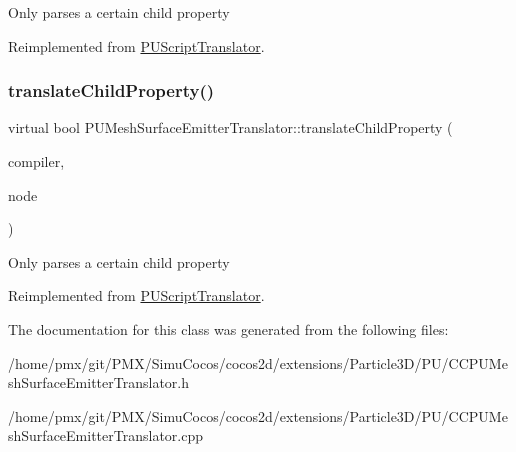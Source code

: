 Only parses a certain child property 

Reimplemented from \hyperlink{classPUScriptTranslator_a0374d83a8a04e57918975d525e0f8fe8}{P\+U\+Script\+Translator}.

\mbox{\label{classPUMeshSurfaceEmitterTranslator_a0f3b7e1bdf56f0eb1920cacffe8f59d9}} 
\subsubsection{\texorpdfstring{translate\+Child\+Property()}{translateChildProperty()}\hspace{0.1cm}{\footnotesize\ttfamily [2/2]}}
{\footnotesize\ttfamily virtual bool P\+U\+Mesh\+Surface\+Emitter\+Translator\+::translate\+Child\+Property (\begin{DoxyParamCaption}\item[{\hyperlink{classPUScriptCompiler}{P\+U\+Script\+Compiler} $\ast$}]{compiler,  }\item[{\hyperlink{classPUAbstractNode}{P\+U\+Abstract\+Node} $\ast$}]{node }\end{DoxyParamCaption})\hspace{0.3cm}{\ttfamily [virtual]}}

Only parses a certain child property 

Reimplemented from \hyperlink{classPUScriptTranslator_a0374d83a8a04e57918975d525e0f8fe8}{P\+U\+Script\+Translator}.



The documentation for this class was generated from the following files\+:\begin{DoxyCompactItemize}
\item 
/home/pmx/git/\+P\+M\+X/\+Simu\+Cocos/cocos2d/extensions/\+Particle3\+D/\+P\+U/C\+C\+P\+U\+Mesh\+Surface\+Emitter\+Translator.\+h\item 
/home/pmx/git/\+P\+M\+X/\+Simu\+Cocos/cocos2d/extensions/\+Particle3\+D/\+P\+U/C\+C\+P\+U\+Mesh\+Surface\+Emitter\+Translator.\+cpp\end{DoxyCompactItemize}
